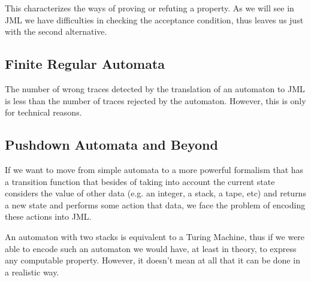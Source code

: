 \documentclass[a4paper,10pt]{article}
\begin{document}
This characterizes the ways of proving or refuting a property. As we will see in
JML we have difficulties in checking the acceptance condition, thus leaves us
just with the second alternative.

\subsection*{Finite Regular Automata}
The number of wrong traces detected by the translation of an automaton to JML is
less than the number of traces rejected by the automaton. However, this is only
for technical reasons.

\subsection*{Pushdown Automata and Beyond}
If we want to move from simple automata to a more powerful formalism that has a
transition function that besides of taking into account the current state
considers the value of other data (e.g. an integer, a stack, a tape, etc) and
returns a new state and performs some action that data, we face the problem of
encoding these actions into JML.

An automaton with two stacks is equivalent to a Turing Machine, thus if we were
able to encode such an automaton we would have, at least in theory, to express
any computable property. However, it doesn't mean at all that it can be done in
a realistic way.
\end{document}
